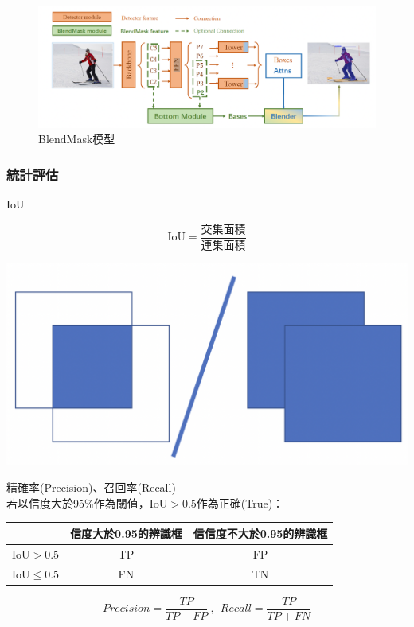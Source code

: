 \begin{figure}[H]
\centering
\includegraphics[width=1\textwidth]{paste_src/2023-02-06-21-01-25.png}
\caption{BlendMask模型}
\label{}
\end{figure}




\subsubsection{統計評估}
\df IoU\\

\begin{minipage}[b]{0.4\textwidth}
$$
\mbox{IoU}=\frac{\mbox{交集面積}}{\mbox{連集面積}}
$$
\hspace*{\fill}
\hspace*{\fill}
\end{minipage}
\begin{minipage}[b]{.4\textwidth}
  \includegraphics[width=1\textwidth]{paste_src/2023-02-06-23-34-01.png}

\end{minipage}

\df 精確率(Precision)、召回率(Recall)\\
若以信度大於95\%作為閾值，$\mbox{IoU}>0.5$作為正確(True)：\\


\begin{tabular}[t]{|c|c|c|}
\hline
 &  信度大於0.95的辨識框 & 信信度不大於0.95的辨識框 \\
\hline
$\mbox{IoU}>0.5$ & TP   & FP \\
$\mbox{IoU}\leq 0.5$  & FN   & TN \\
\hline
\end{tabular}
\hspace*{\fill}
$$
Precision=\frac{TP}{TP+FP}\ ,
\ \ 
Recall=\frac{TP}{TP+FN}
$$


